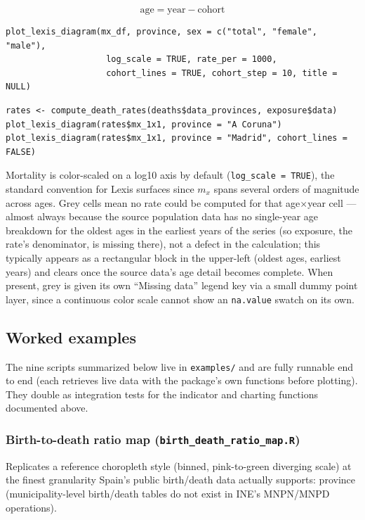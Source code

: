 \documentclass[11pt]{article}
\newcommand{\fn}[1]{\texttt{#1}}
\begin{document}
\begin{equation}
\text{age} = \text{year} - \text{cohort}
\end{equation}

\begin{lstlisting}
plot_lexis_diagram(mx_df, province, sex = c("total", "female", "male"),
                    log_scale = TRUE, rate_per = 1000,
                    cohort_lines = TRUE, cohort_step = 10, title = NULL)
\end{lstlisting}

\begin{lstlisting}
rates <- compute_death_rates(deaths$data_provinces, exposure$data)
plot_lexis_diagram(rates$mx_1x1, province = "A Coruna")
plot_lexis_diagram(rates$mx_1x1, province = "Madrid", cohort_lines = FALSE)
\end{lstlisting}

Mortality is color-scaled on a log10 axis by default (\fn{log\_scale =
TRUE}), the standard convention for Lexis surfaces since $m_x$ spans several
orders of magnitude across ages. Grey cells mean no rate could be computed
for that age$\times$year cell --- almost always because the source
population data has no single-year age breakdown for the oldest ages in the
earliest years of the series (so exposure, the rate's denominator, is
missing there), not a defect in the calculation; this typically appears as
a rectangular block in the upper-left (oldest ages, earliest years) and
clears once the source data's age detail becomes complete. When present,
grey is given its own ``Missing data'' legend key via a small dummy point
layer, since a continuous color scale cannot show an \fn{na.value} swatch on
its own.

\subsection{Worked examples}

The nine scripts summarized below live in \fn{examples/} and are fully
runnable end to end (each retrieves live data with the package's own
functions before plotting). They double as integration tests for the
indicator and charting functions documented above.

\subsubsection{Birth-to-death ratio map (\fn{birth\_death\_ratio\_map.R})}

Replicates a reference choropleth style (binned, pink-to-green diverging
scale) at the finest granularity Spain's public birth/death data actually
supports: province (municipality-level birth/death tables do not exist in
INE's MNPN/MNPD operations).
\end{document}
